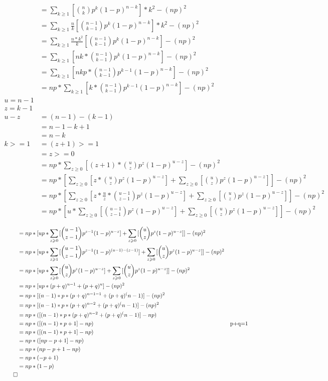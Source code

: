 \documentclass[]{article}
\begin{document}
\begin{align}
&= \sum_{k \geqslant 1} {[\binom{n} {k} p^k (1-p)^{n-k}]*k^2} - (np)^2\\
&= \sum_{k \geqslant 1} {\frac{n}{k} [\binom{n-1} {k-1} p^k (1-p)^{n-k}]*k^2} - (np)^2\\
&= \sum_{k \geqslant 1} {\frac{n*k^2}{k} [\binom{n-1} {k-1} p^k (1-p)^{n-k}]} - (np)^2\\
&= \sum_{k \geqslant 1} {[nk*\binom{n-1} {k-1} p^k (1-p)^{n-k}]} - (np)^2\\
&= \sum_{k \geqslant 1} {[nkp*\binom{n-1} {k-1} p^{k-1} (1-p)^{n-k}]} - (np)^2\\
&= np*\sum_{k \geqslant 1} {[k*\binom{n-1} {k-1} p^{k-1} (1-p)^{n-k}]} - (np)^2\\
u = n-1\\
z = k-1\\
u-z&=(n-1)-(k-1)\\
&=n-1-k+1\\
&=n-k\\
k >= 1 &= (z+1) >=1\\
&= z >= 0\\
&= np*\sum_{z \geqslant 0} {[(z+1)* \binom{u} {z} p^{z} (1-p)^{u-z}]} - (np)^2\\
&= np*[\sum_{z \geqslant 0} {[z*\binom{u} {z} p^{z} (1-p)^{u-z}]} + \sum_{z \geqslant 0} {[\binom{u} {z} p^{z} (1-p)^{u-z}]}] - (np)^2\\
&= np*[\sum_{z \geqslant 0} {[z*\frac{u}{z}*\binom{u-1} {z-1} p^{z} (1-p)^{u-z}]} + \sum_{z \geqslant 0} {[\binom{u} {z} p^{z} (1-p)^{u-z}]}] - (np)^2\\
&= np*[u*\sum_{z \geqslant 0} {[\binom{u-1} {z-1} p^{z} (1-p)^{u-z}]} + \sum_{z \geqslant 0} {[\binom{u} {z} p^{z} (1-p)^{u-z}]}] - (np)^2\\
\end{align}
\begin{align}
&= np*[up*\sum_{z \geqslant 0} {[\binom{u-1} {z-1} p^{z-1} (1-p)^{u-z}]} + \sum_{z \geqslant 0} {[\binom{u} {z} p^{z} (1-p)^{u-z}]}] - (np)^2\\
&= np*[up*\sum_{z \geqslant 1} {[\binom{u-1} {z-1} p^{z-1} (1-p)^{(u-1)-(z-1)}]} + \sum_{z \geqslant 0} {[\binom{u} {z} p^{z} (1-p)^{u-z}]}] - (np)^2\\
&= np*[up*\sum_{z \geqslant 0} {[\binom{u} {z} p^{z} (1-p)^{u-z}]} + \sum_{z \geqslant 0} {[\binom{u} {z} p^{z} (1-p)^{u-z}]}] - (np)^2\\
&= np*[up*(p+q)^{u-1} + (p+q)^u] - (np)^2\\
&= np*[(n-1)*p*(p+q)^{n-1-1}+(p+q)^(n-1)] -(np)^2\\
&= np*[(n-1)*p*(p+q)^{n-2}+(p+q)^(n-1)] - (np)^2\\
&= np*([(n-1)*p*(p+q)^{n-2}+(p+q)^(n-1)] - np)\\
&= np*([(n-1)*p+1] - np) && \text{p+q=1}\\
&= np*([(n-1)*p+1] - np)\\
&= np*([np-p +1] - np)\\
&= np*(np-p +1- np)\\
&= np*(-p +1)\\
&= np*(1-p)\\
\qed
\end{align}
\end{document}
